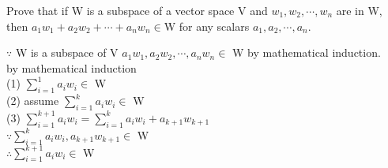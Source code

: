 Prove that if W is a subspace of a vector space V and $w_1,w_2,\cdots,w_n$ are in W, then $a_1w_1+a_2w_2+\cdots+a_nw_n \in $W for any scalars $a_1,a_2,\cdots,a_n$.

\begin{tcolorbox}
	\begin{solution} $ $\\
		$\because$ W is a subspace of V
		$a_1w_1,a_2w_2,\cdots,a_nw_n \in$ W by mathematical induction.\\
		by mathematical induction\\
		(1) $\sum^1_{i=1}a_iw_i \in$ W\\
		(2) assume $\sum^k_{i=1}a_iw_i \in $ W\\
		(3) $\sum^{k+1}_{i=1}a_iw_i = \sum^{k}_{i=1}a_iw_i + a_{k+1}w_{k+1} $\\
		$\because \sum^{k}_{i=1}a_iw_i , a_{k+1}w_{k+1} \in $ W\\
		$\therefore \sum^{k+1}_{i=1}a_iw_i \in $ W
	\end{solution}
\end{tcolorbox}